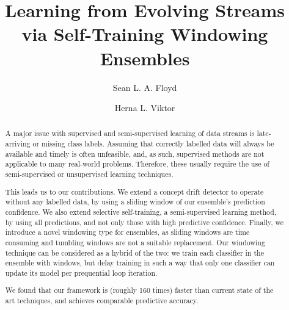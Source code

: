 \documentclass[runningheads]{llncs}
\begin{document}
%
\title{Learning from Evolving Streams via Self-Training Windowing Ensembles}
%
%
\author{Sean L. A. Floyd \and
Herna L. Viktor}
%
%
%
\maketitle              %
%
\begin{abstract}
A major issue with supervised and semi-supervised learning of data streams is late-arriving or missing class labels. Assuming that correctly labelled data will always be available and timely is often unfeasible, and, as such, supervised methods are not applicable to many real-world problems. Therefore, these usually require the use of semi-supervised or unsupervised learning techniques.

This leads us to our contributions. We extend a concept drift detector to operate without any labelled data, by using a sliding window of our ensemble's prediction confidence. We also extend selective self-training, a semi-supervised learning method, by using all predictions, and not only those with high predictive confidence. Finally, we introduce a novel windowing type for ensembles, as sliding windows are time consuming and tumbling windows are not a suitable replacement. Our windowing technique can be considered as a hybrid of the two: we train each classifier in the ensemble with windows, but delay training in such a way that only one classifier can update its model per prequential loop iteration.

We found that our framework is (roughly 160 times) faster than current state of the art techniques, and achieves comparable predictive accuracy.

\end{abstract}
%
%
%
\end{document}
